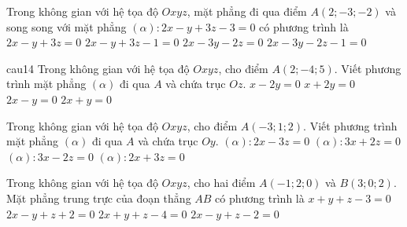 \begin{ex}%
	Trong không gian với hệ tọa độ  $Oxyz$, mặt phẳng đi qua điểm $A(2;-3;-2)$ và song song với mặt phẳng $(\alpha)\colon 2x - y + 3z - 3 = 0$ có phương trình là
	\choice 
		 {$2x - y + 3z = 0$}
		{\True $2x - y +  3z - 1 = 0$}
		{$2x - 3y  - 2z = 0$}
		{$2x - 3y -  2z - 1 = 0$}
\end{ex}

\begin{ex}%
	cau14 
	Trong không gian với hệ tọa độ $Oxyz$, cho điểm $A(2;-4;5)$. Viết phương trình mặt phẳng $(\alpha)$ đi qua $A$ và chứa trục $Oz$. 
	\choice 
		 {$ x - 2y = 0$}
		{$x + 2y  = 0$}
		{$2x - y =  0$}
		{\True $2x  + y = 0$}
\end{ex}

\begin{ex}%
	Trong không gian với hệ tọa độ $Oxyz$, cho điểm $A(-3;1;2)$. Viết phương trình mặt phẳng $(\alpha)$  đi qua $A$ và chứa trục $Oy$.
	 \choice
		{$(\alpha): 2x -  3z = 0$}
		{$(\alpha): 3x + 2z = 0$} 
		{$(\alpha): 3x - 2z = 0$} 
		{\True $(\alpha)\colon 2x  + 3z = 0$}
\end{ex}

\begin{ex}%
	Trong không gian với  hệ tọa độ $Oxyz$, cho hai điểm $A(-1;2;0)$ và $B(3;0;2)$. Mặt phẳng trung trực của đoạn thẳng $AB$ có phương trình là
	 \choice
		{$x + y +  z - 3 = 0$}
		{$2x - y +  z + 2 = 0$}
		{$2x + y + z - 4 =  0$}
		{\True $2x - y + z - 2 =  0$}
\end{ex}

